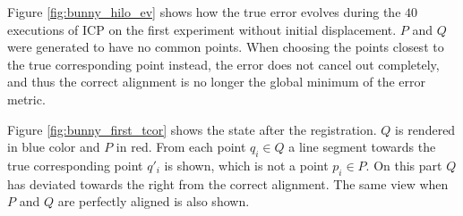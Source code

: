 Figure \ref{fig:bunny_hilo_ev} shows how the true error evolves during the $40$ executions of ICP on the first experiment without initial displacement. $P$ and $Q$ were generated to have no common points. When choosing the points closest to the true corresponding point instead, the error does not cancel out completely, and thus the correct alignment is no longer the global minimum of the error metric.

Figure \ref{fig:bunny_first_tcor} shows the state after the registration. $Q$ is rendered in blue color and $P$ in red. From each point $q_i \in Q$ a line segment towards the true corresponding point $q'_i$ is shown, which is not a point $p_i \in P$. On this part $Q$ has deviated towards the right from the correct alignment. The same view when $P$ and $Q$ are perfectly aligned is also shown.

